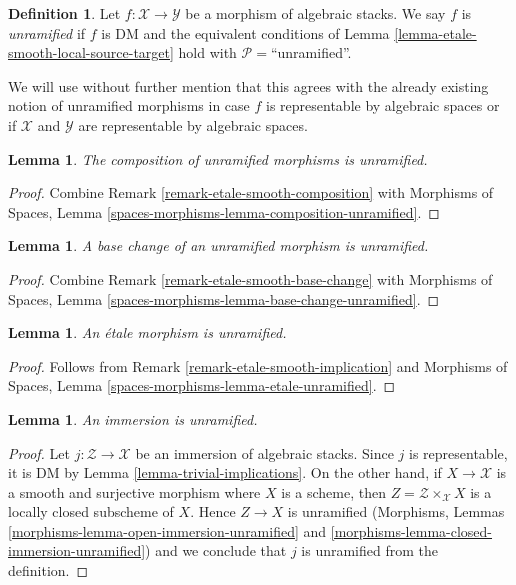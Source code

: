 \documentclass{stacks-project}
\theoremstyle{plain}
\newtheorem{lemma}[subsection]{Lemma}
\theoremstyle{definition}
\newtheorem{definition}[subsection]{Definition}
\theoremstyle{remark}
\numberwithin{equation}{subsection}
\begin{document}
\begin{definition}
\label{definition-unramified}
Let $f : \mathcal{X} \to \mathcal{Y}$ be a morphism of algebraic stacks.
We say $f$ is {\it unramified} if $f$ is DM and the equivalent conditions of
Lemma \ref{lemma-etale-smooth-local-source-target}
hold with $\mathcal{P} =$``unramified''.
\end{definition}

\noindent
We will use without further mention that this agrees with the already
existing notion of unramified morphisms in case $f$ is representable
by algebraic spaces or if $\mathcal{X}$ and $\mathcal{Y}$ are
representable by algebraic spaces.

\begin{lemma}
\label{lemma-composition-unramified}
The composition of unramified morphisms is unramified.
\end{lemma}

\begin{proof}
Combine Remark \ref{remark-etale-smooth-composition}
with
Morphisms of Spaces, Lemma \ref{spaces-morphisms-lemma-composition-unramified}.
\end{proof}

\begin{lemma}
\label{lemma-base-change-unramified}
A base change of an unramified morphism is unramified.
\end{lemma}

\begin{proof}
Combine
Remark \ref{remark-etale-smooth-base-change}
with
Morphisms of Spaces, Lemma \ref{spaces-morphisms-lemma-base-change-unramified}.
\end{proof}

\begin{lemma}
\label{lemma-etale-unramified}
An \'etale morphism is unramified.
\end{lemma}

\begin{proof}
Follows from Remark \ref{remark-etale-smooth-implication}
and Morphisms of Spaces, Lemma
\ref{spaces-morphisms-lemma-etale-unramified}.
\end{proof}

\begin{lemma}
\label{lemma-immersion-unramified}
An immersion is unramified.
\end{lemma}

\begin{proof}
Let $j : \mathcal{Z} \to \mathcal{X}$ be an immersion of
algebraic stacks. Since $j$ is representable, it is DM by
Lemma \ref{lemma-trivial-implications}. On the other hand,
if $X \to \mathcal{X}$ is a smooth and surjective morphism
where $X$ is a scheme, then $Z = \mathcal{Z} \times_\mathcal{X} X$
is a locally closed subscheme of $X$. Hence $Z \to X$ is unramified
(Morphisms, Lemmas \ref{morphisms-lemma-open-immersion-unramified} and
\ref{morphisms-lemma-closed-immersion-unramified})
and we conclude that $j$ is unramified from the definition.
\end{proof}
\end{document}
